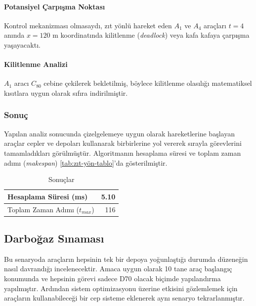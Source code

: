     \paragraph{Potansiyel Çarpışma Noktası} Kontrol mekanizması olmasaydı, zıt yönlü hareket eden $A_1$ ve $A_4$ araçları $t = 4$ anında $x = 120\text{ m}$ koordinatında kilitlenme (\textit{deadlock}) veya kafa kafaya çarpışma yaşayacaktı.
    
    \paragraph{Kilitlenme Analizi} $A_1$ aracı $C_{80}$ cebine çekilerek bekletilmiş, böylece kilitlenme olasılığı matematiksel kısıtlara uygun olarak sıfıra indirilmiştir.
    
    \subsubsection{Sonuç}
    
    Yapılan analiz sonucunda çizelgelemeye uygun olarak hareketlerine başlayan araçlar cepler ve depoları kullanarak birbirlerine yol vererek sırayla görevlerini tamamladıkları görülmüştür. Algoritmanın hesaplama süresi ve toplam zaman adımı (\textit{makespan}) \autoref{tab:zıt-yön-tablo}'da gösterilmiştir.
    
    \begin{table}[h]
        \centering
        \caption{Sonuçlar} \label{tab:zıt-yön-tablo}
        \begin{tabular}{lr}
            \hline
            Hesaplama Süresi (ms) & 5.10 \\
            \hline
            Toplam Zaman Adımı ($t_{max}$) & 116 \\
            \hline
        \end{tabular}
    \end{table}

\subsection{Darboğaz Sınaması} \label{sec:darboğaz-sınaması}
  
    Bu senaryoda araçların hepsinin tek bir depoya yoğunlaştığı durumda düzeneğin nasıl davrandığı incelenecektir. Amaca uygun olarak 10 tane araç başlangıç konumunda ve hepsinin görevi sadece D70 olacak biçimde yapılandırma yapılmıştır. Ardından sistem optimizasyonu üzerine etkisini gözlemlemek için araçların kullanabileceği bir cep sisteme eklenerek aynı senaryo tekrarlanmıştır.
    
